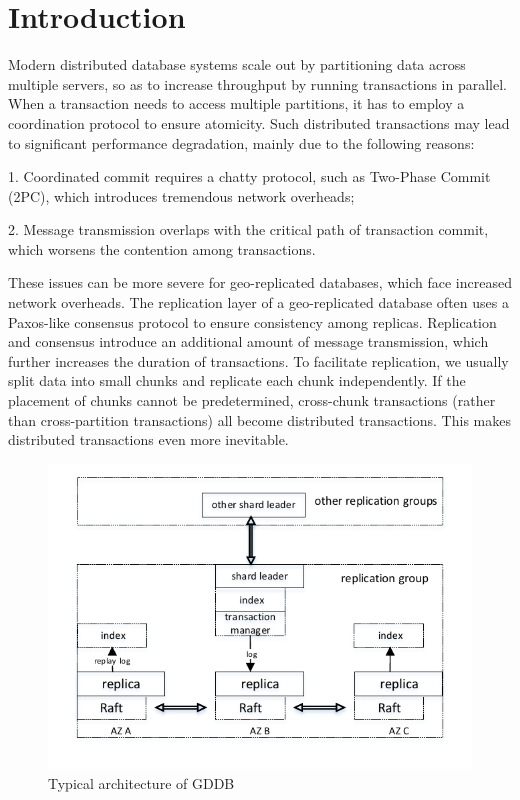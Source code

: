 \documentclass[conference]{IEEEtran}
\begin{document}
\section{Introduction}

Modern distributed database systems scale out by partitioning data across multiple servers, 
so as to increase throughput by running transactions in parallel.
When a transaction needs to access multiple partitions, it has to employ a coordination protocol to ensure atomicity.
Such distributed transactions may lead to significant performance degradation, mainly due to the following reasons\cite{Calvin:conf/sigmod/ThomsonDWRSA12}:

1. Coordinated commit requires a chatty protocol, such as Two-Phase Commit (2PC), which introduces tremendous network overheads;

2. Message transmission overlaps with the critical path of transaction commit, which worsens the contention among transactions.

These issues can be more severe for geo-replicated databases, which face increased network overheads.
The replication layer of a geo-replicated database often uses a Paxos-like consensus protocol to ensure consistency among replicas.
Replication and consensus introduce an additional amount of message transmission, which further increases the duration of transactions.
To facilitate replication, we usually split data into small chunks and replicate each chunk independently.
If the placement of chunks cannot be predetermined, cross-chunk transactions (rather than cross-partition transactions) all become distributed transactions.
This makes distributed transactions even more inevitable.

\begin{figure}[tbp]
  \centerline{\includegraphics[scale=0.8]{figure/architecture.pdf}}
  \caption{Typical architecture of GDDB}
  \label{fig:architecture}
\end{figure}
\end{document}
